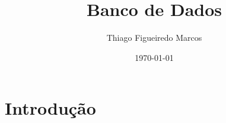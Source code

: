 \documentclass[12pt, onecolumn]{article}
\title{Banco de Dados}
\author{Thiago Figueiredo Marcos}
\date{\today}
\begin{document}
	
	\maketitle
	
	\begin{abstract}

	\end{abstract}


	\section{\centering Introdução}
\end{document}
